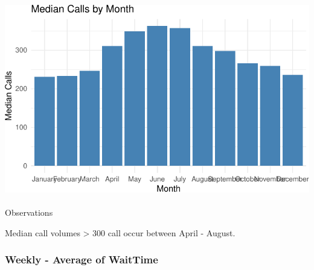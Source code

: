 \documentclass[
  letterpaper,
  DIV=11,
  numbers=noendperiod]{scrartcl}
\makeatletter
\let\oldparagraph\paragraph
\renewcommand{\paragraph}{
    \@ifstar
      \xxxParagraphStar
      \xxxParagraphNoStar
  }
\newcommand{\xxxParagraphStar}[1]{\oldparagraph*{#1}\mbox{}}
\newcommand{\xxxParagraphNoStar}[1]{\oldparagraph{#1}\mbox{}}
\makeatother
\begin{document}
\includegraphics{final_proj_group1_files/figure-pdf/unnamed-chunk-2-1.pdf}

\paragraph{Observations}\label{observations-8}

Median call volumes \textgreater{} 300 call occur between April -
August.

\subsubsection{Weekly - Average of
WaitTime}\label{weekly---average-of-waittime}
\end{document}
